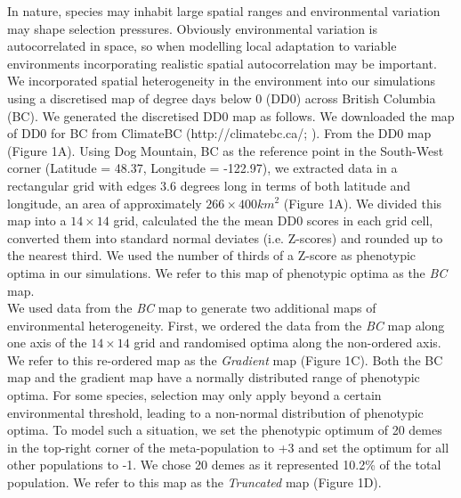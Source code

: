 \documentclass[10pt,twoside,lineno, twocolumn]{GSA_format}
\begin{document}
In nature, species may inhabit large spatial ranges and environmental variation may shape selection pressures. Obviously environmental variation is autocorrelated in space, so when modelling local adaptation to variable environments incorporating realistic spatial autocorrelation may be important. \\

We incorporated spatial heterogeneity in the environment into our simulations using a discretised map of degree days below 0 (DD0) across British Columbia (BC). We generated the discretised DD0 map as follows. We downloaded the map of DD0 for BC from ClimateBC (http://climatebc.ca/; \cite{Wang2016}). From the DD0 map (Figure 1A). Using Dog Mountain, BC as the reference point in the South-West corner (Latitude = 48.37, Longitude = -122.97), we extracted data in a rectangular grid with edges 3.6 degrees long in terms of both latitude and longitude, an area of approximately $266\times400 km^2$ (Figure 1A). We divided this map into a $14\times14$ grid, calculated the the mean DD0 scores in each grid cell, converted them into standard normal deviates (i.e. Z-scores) and rounded up to the nearest third. We used the number of thirds of a Z-score as phenotypic optima in our simulations. We refer to this map of phenotypic optima as the \textit{BC} map.\\

We used data from the \textit{BC} map to generate two additional maps of environmental heterogeneity. First, we ordered the data from the \textit{BC} map along one axis of the $14\times14$ grid and randomised optima along the non-ordered axis. We refer to this re-ordered map as the \textit{Gradient} map (Figure 1C). Both the BC map and the gradient map have a normally distributed range of phenotypic optima. For some species, selection may only apply beyond a certain environmental threshold, leading to a non-normal distribution of phenotypic optima. To model such a situation, we set the phenotypic optimum of 20 demes in the top-right corner of the meta-population to +3 and set the optimum for all other populations to -1. We chose 20 demes as it represented 10.2\% of the total population. We refer to this map as the \textit{Truncated} map (Figure 1D).\\



\end{document}
